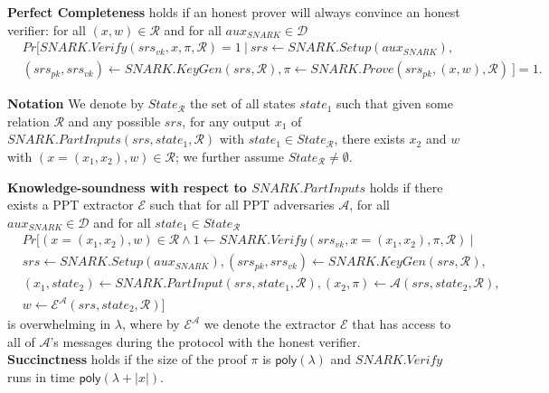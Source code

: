 \begin{definition}
\noindent \textbf{Perfect Completeness} holds if an honest prover will always convince an honest verifier: for all  
$(x,w) \in \mathcal{R}$ and for all $\mathit{aux_{\mathit{SNARK}}} \in \mathcal{D}$
\begin{align*}
& \mathit{Pr}[\mathit{SNARK.Verify}(\mathit{srs_{vk}}, x, \pi, \mathcal{R}) = 1 \ | \  
\mathit{srs} \leftarrow \mathit{SNARK.Setup}(\mathit{aux_{\mathit{SNARK}}}), \\ 
& (\mathit{srs_{pk}}, \mathit{srs_{vk}})\leftarrow \mathit{SNARK.KeyGen}(\mathit{srs}, \mathcal{R}), \pi \leftarrow \mathit{SNARK.Prove}(\mathit{srs_{pk}}, (x,w), \mathcal{R}) \ ] = 1.
\end{align*}

\noindent \textbf{Notation} We denote by $\mathit{State_{\mathcal{R}}}$ the set of all states $\mathit{state}_1$ 
such that given some relation $\mathcal{R}$ and any possible $\mathit{srs}$, 
for any output $x_1$ of  $\mathit{SNARK.PartInputs}(\mathit{srs}, \mathit{state}_1, \mathcal{R})$ 
with $\mathit{state_1} \in \mathit{State_{\mathcal{R}}}$, there exists $x_2$ and $w$ with $(x=(x_1, x_2), w) \in \mathcal{R}$; 
we further assume $\mathit{State_{\mathcal{R}}} \neq \emptyset$.\\
\vspace{-0.08in}

\noindent \textbf{Knowledge-soundness with respect to $\mathit{SNARK.PartInputs}$}
holds if there exists a PPT extractor $\mathcal{E}$ such that for all PPT 
adversaries $\mathcal{A}$, for all $\mathit{aux_{\mathit{SNARK}}} \in \mathcal{D}$ and for all $\mathit{state_1} \in \mathit{State_{\mathcal{R}}}$
\begin{align*}
&\mathit{Pr}[(x = (x_1, x_2), w) \in \mathcal{R} \wedge 1 \leftarrow \mathit{SNARK.Verify}(\mathit{srs_{vk}}, x =  (x_1, x_2), \pi, \mathcal{R}) \ | \\
&\mathit{srs} \leftarrow \mathit{SNARK.Setup}(\mathit{aux_{\mathit{SNARK}}}), (\mathit{srs_{pk}}, \mathit{srs_{vk}})\leftarrow  \mathit{SNARK.KeyGen}(\mathit{srs}, \mathcal{R}), \\ 
& (x_1, \mathit{state}_2) \leftarrow \mathit{SNARK.PartInput}(\mathit{srs}, \mathit{state}_1, \mathcal{R}), (x_2, \pi) \leftarrow \mathcal{A}(\mathit{srs}, \mathit{state}_2, \mathcal{R}), \\
& w \leftarrow \mathcal{E}^{\mathcal{A}}(srs,\mathit{state_2}, \mathcal{R})]
\end{align*}
\noindent is overwhelming in $\lambda$, where by $\mathcal{E}^{\mathcal{A}}$ we denote the extractor $\mathcal{E}$ that has access to all of 
$\mathcal{A}$'s messages during the protocol with the honest verifier. \\ 
\noindent \textbf{Succinctness} holds if the size of the proof $\pi$ is $\mathsf{poly}(\lambda)$ and $\mathit{SNARK.Verify}$ runs in time 
$\mathsf{poly}(\lambda + |x|)$. %
\end{definition}
